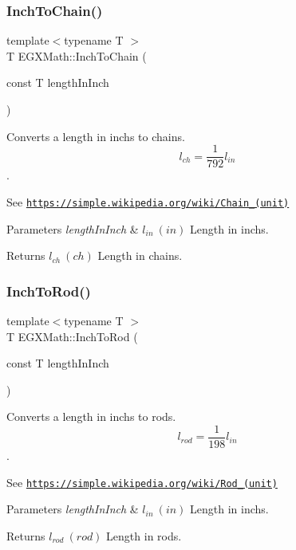 \subsubsection{\texorpdfstring{Inch\+To\+Chain()}{InchToChain()}}
{\footnotesize\ttfamily template$<$typename T $>$ \\
T E\+G\+X\+Math\+::\+Inch\+To\+Chain (\begin{DoxyParamCaption}\item[{const T}]{length\+In\+Inch }\end{DoxyParamCaption})}



Converts a length in inchs to chains. \[ l_{ch}= \frac{1}{792} l_{in} \]. 

See \href{https://simple.wikipedia.org/wiki/Chain_(unit)}{\tt https\+://simple.\+wikipedia.\+org/wiki/\+Chain\+\_\+(unit)} 
\begin{DoxyParams}{Parameters}
{\em length\+In\+Inch} & $ l_{in}\ (in)$ Length in inchs. \\
\hline
\end{DoxyParams}
\begin{DoxyReturn}{Returns}
$ l_{ch}\ (ch)$ Length in chains. 
\end{DoxyReturn}
\mbox{\label{group___e_g_x_math-_conversions-_length_conversions-_imperial-_inch-_surveyors_gaa045e03f8adf2c109c70a2446ac391ef}} 
\subsubsection{\texorpdfstring{Inch\+To\+Rod()}{InchToRod()}}
{\footnotesize\ttfamily template$<$typename T $>$ \\
T E\+G\+X\+Math\+::\+Inch\+To\+Rod (\begin{DoxyParamCaption}\item[{const T}]{length\+In\+Inch }\end{DoxyParamCaption})}



Converts a length in inchs to rods. \[ l_{rod}= \frac{1}{198} l_{in} \]. 

See \href{https://simple.wikipedia.org/wiki/Rod_(unit)}{\tt https\+://simple.\+wikipedia.\+org/wiki/\+Rod\+\_\+(unit)} 
\begin{DoxyParams}{Parameters}
{\em length\+In\+Inch} & $ l_{in}\ (in)$ Length in inchs. \\
\hline
\end{DoxyParams}
\begin{DoxyReturn}{Returns}
$ l_{rod}\ (rod)$ Length in rods. 
\end{DoxyReturn}
